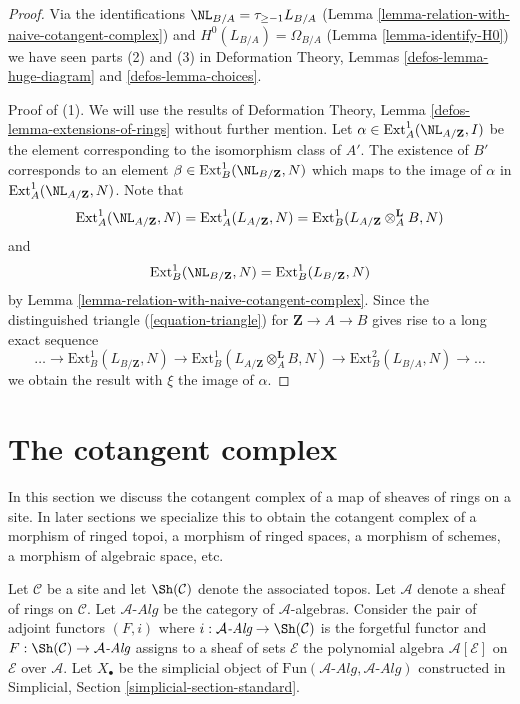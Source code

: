 \begin{proof}
Via the identifications $\NL_{B/A} = \tau_{\geq -1}L_{B/A}$
(Lemma \ref{lemma-relation-with-naive-cotangent-complex}) and
$H^0(L_{B/A}) = \Omega_{B/A}$
(Lemma \ref{lemma-identify-H0})
we have seen parts (2) and (3) in
Deformation Theory, Lemmas \ref{defos-lemma-huge-diagram} and
\ref{defos-lemma-choices}.

\medskip\noindent
Proof of (1). We will use the results of
Deformation Theory, Lemma \ref{defos-lemma-extensions-of-rings}
without further mention.
Let $\alpha \in \text{Ext}^1_A(\NL_{A/\mathbf{Z}}, I)$
be the element corresponding to the isomorphism class of $A'$.
The existence of $B'$ corresponds to an element
$\beta \in \text{Ext}_B^1(\NL_{B/\mathbf{Z}}, N)$
which maps to the image of $\alpha$ in
$\text{Ext}^1_A(\NL_{A/\mathbf{Z}}, N)$. Note that
$$
\text{Ext}^1_A(\NL_{A/\mathbf{Z}}, N) =
\text{Ext}^1_A(L_{A/\mathbf{Z}}, N) =
\text{Ext}^1_B(L_{A/\mathbf{Z}} \otimes_A^\mathbf{L} B, N)
$$
and
$$
\text{Ext}^1_B(\NL_{B/\mathbf{Z}}, N) =
\text{Ext}^1_B(L_{B/\mathbf{Z}}, N)
$$
by Lemma \ref{lemma-relation-with-naive-cotangent-complex}.
Since the distinguished triangle (\ref{equation-triangle})
for $\mathbf{Z} \to A \to B$ gives rise to a long exact sequence
$$
\ldots \to
\text{Ext}^1_B(L_{B/\mathbf{Z}}, N) \to
\text{Ext}^1_B(L_{A/\mathbf{Z}} \otimes_A^\mathbf{L} B, N) \to
\text{Ext}^2_B(L_{B/A}, N) \to \ldots
$$
we obtain the result with $\xi$ the image of $\alpha$.
\end{proof}







\section{The cotangent complex}
\label{section-cotangent-complex}

\noindent
In this section we discuss the cotangent complex of a map of sheaves
of rings on a site. In later sections we specialize this to obtain
the cotangent complex of a morphism of ringed topoi, a morphism of
ringed spaces, a morphism of schemes, a morphism of algebraic space, etc.

\medskip\noindent
Let $\mathcal{C}$ be a site and let $\Sh(\mathcal{C})$ denote the
associated topos. Let $\mathcal{A}$ denote a sheaf of rings
on $\mathcal{C}$. Let $\mathcal{A}\textit{-Alg}$ be the category of
$\mathcal{A}$-algebras. Consider the pair of adjoint functors $(F, i)$ where
$i : \mathcal{A}\textit{-Alg} \to \Sh(\mathcal{C})$ is the forgetful functor and
$F : \Sh(\mathcal{C}) \to \mathcal{A}\textit{-Alg}$ assigns to a sheaf of sets
$\mathcal{E}$ the polynomial algebra $\mathcal{A}[\mathcal{E}]$ on
$\mathcal{E}$ over $\mathcal{A}$.
Let $X_\bullet$ be the simplicial object of
$\text{Fun}(\mathcal{A}\textit{-Alg}, \mathcal{A}\textit{-Alg})$
constructed in
Simplicial, Section \ref{simplicial-section-standard}.

